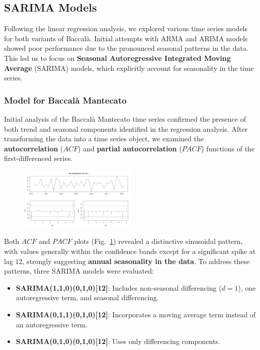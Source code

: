 \documentclass[10pt,twocolumn,letterpaper]{article}
\begin{document}
\subsection{SARIMA Models}
Following the linear regression analysis, we explored various time series models for both variants of Baccalà. Initial attempts with ARMA and ARIMA models showed poor performance due to the pronounced seasonal patterns in the data. This led us to focus on \textbf{Seasonal Autoregressive Integrated Moving Average} (SARIMA) models, which explicitly account for seasonality in the time series.

\subsubsection{Model for Baccalà Mantecato}
Initial analysis of the Baccalà Mantecato time series confirmed the presence of both trend and seasonal components identified in the regression analysis. After transforming the data into a time series object, we examined the \textbf{autocorrelation} ($ACF$) and \textbf{partial autocorrelation} ($PACF$) functions of the first-differenced series. 

\begin{figure}[H]
    \centering
    \includegraphics[width=0.5\textwidth]{PlotsBEFD/ACF_MAN_LAG1.png} 
    \caption{}
    \label{fig:ACF_MAN_LAG1}
\end{figure}

Both $ACF$ and $PACF$ plots (Fig.~\ref{fig:ACF_MAN_LAG1}) revealed a distinctive sinusoidal pattern, with values generally within the confidence bands except for a significant spike at lag $12$, strongly suggesting \textbf{annual seasonality in the data}.
To address these patterns, three SARIMA models were evaluated:
\begin{itemize}[noitemsep, topsep=0pt]
    \item \textbf{SARIMA(1,1,0)(0,1,0)[12]}: Includes non-seasonal differencing ($d=1$), one autoregressive term, and seasonal differencing.
    \item \textbf{SARIMA(0,1,1)(0,1,0)[12]}: Incorporates a moving average term instead of an autoregressive term.
    \item \textbf{SARIMA(0,1,0)(0,1,0)[12]}: Uses only differencing components.
\end{itemize}
\end{document}
